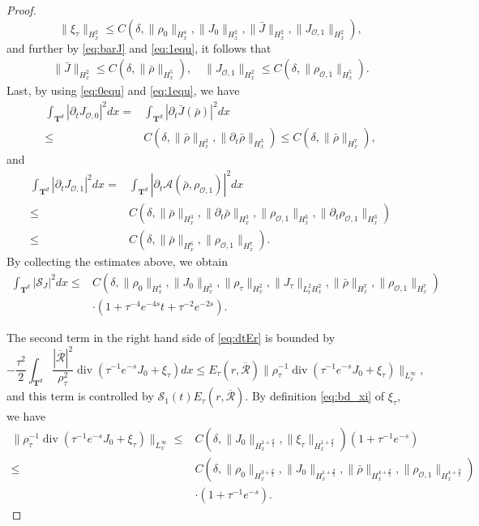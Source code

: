 \documentclass[english]{amsart}
\theoremstyle{plain}
\theoremstyle{definition}
\theoremstyle{remark}
\theoremstyle{plain}
\theoremstyle{plain}
\theoremstyle{plain}
\def\T{{\mathbf T}}%
\def\d{{\partial}}
\DeclareMathOperator{\diver}{div}
\numberwithin{equation}{section}
\begin{document}
\begin{proof}
\begin{equation}
\|\xi_\tau\|_{H^2_x}\leq C(\delta,\|\rho_0\|_{H^4_x},\|J_0\|_{H^2_x},\|\bar J\|_{H^2_x},\|J_{\mathcal{O},1}\|_{H^2_x}),
\end{equation}
and further by \eqref{eq:barJ} and \eqref{eq:1equ}, it follows that
\begin{align*}
\|\bar J\|_{H^2_x}\leq C(\delta,\|\bar\rho\|_{H^5_x}),\quad \|J_{\mathcal{O},1}\|_{H^2_x}\leq C(\delta,\|\rho_{\mathcal{O},1}\|_{H^5_x}).
\end{align*}
Last, by using \eqref{eq:0equ} and \eqref{eq:1equ}, we have
\begin{align*}
\int_{\T^d} |\d_tJ_{\mathcal{O},0}|^2dx= &\int_{\T^d} |\d_t\bar J(\bar\rho)|^2dx\\
\leq & C(\delta,\|\bar\rho\|_{H^3_x},\|\d_t\bar\rho\|_{H^3_x})\leq C(\delta,\|\bar\rho\|_{H^7_x}),
\end{align*}
and
\begin{align*}
\int_{\T^d} |\d_tJ_{\mathcal{O},1}|^2dx= &\int_{\T^d} |\d_t\mathcal{A}(\bar\rho,\rho_{\mathcal{O},1})|^2dx\\
\leq & C(\delta,\|\bar\rho\|_{H^3_x},\|\d_t\bar\rho\|_{H^3_x},\|\rho_{\mathcal{O},1}\|_{H^3_x},\|\d_t\rho_{\mathcal{O},1}\|_{H^3_x})\\
\leq & C(\delta,\|\bar\rho\|_{H^6_x},\|\rho_{\mathcal{O},1}\|_{H^7_x}).
\end{align*}
By collecting the estimates above, we obtain
\begin{equation}\label{eq:estS_1}
\begin{aligned}
\int_{\T^d} |\mathcal{S}_J|^2dx\leq & C(\delta,\|\rho_0\|_{H^4_x},\|J_0\|_{H^3_x},\|\rho_\tau\|_{H^2_x},\|J_\tau\|_{L^2_tH^2_x},\|\bar\rho\|_{H^7_x},\|\rho_{\mathcal{O},1}\|_{H^7_x})\\
&\cdot(1+\tau^{-4}e^{-4s}t+\tau^{-2}e^{-2s}).
\end{aligned}
\end{equation}

The second term in the right hand side of \eqref{eq:dtEr} is bounded by
\[
-\frac{\tau^2}{2}\int_{\T^d}\frac{|\overline{\mathcal{R}}|^2}{\rho_\tau^2}\diver(\tau^{-1}e^{-s}J_0+\xi_\tau)dx\leq E_\tau(r,\overline{\mathcal{R}})\|\rho_\tau^{-1}\diver(\tau^{-1}e^{-s}J_0+\xi_\tau)\|_{L^\infty_x},
\]
and this term is controlled by $\mathcal{S}_1(t) E_\tau(r,\overline{\mathcal{R}})$. 
By definition \eqref{eq:bd_xi} of $\xi_\tau$, we have
\begin{equation}\label{eq:estS_2}
\begin{aligned}
\|\rho_\tau^{-1}\diver(\tau^{-1}e^{-s}J_0+\xi_\tau)\|_{L^\infty_x}\leq &C(\delta,\|J_0\|_{H^{1+\frac{d}{2}}_x},\|\xi_\tau\|_{H^{1+\frac{d}{2}}_x})(1+\tau^{-1}e^{-s})\\
\leq & C(\delta,\|\rho_0\|_{H^{3+\frac{d}{2}}_x},\|J_0\|_{H^{1+\frac{d}{2}}_x},\|\bar \rho\|_{H^{4+\frac{d}{2}}_x},\|\rho_{\mathcal{O},1}\|_{H^{4+\frac{d}{2}}_x})\\
&\cdot(1+\tau^{-1}e^{-s}).
\end{aligned}
\end{equation}


\end{proof}
\end{document}
